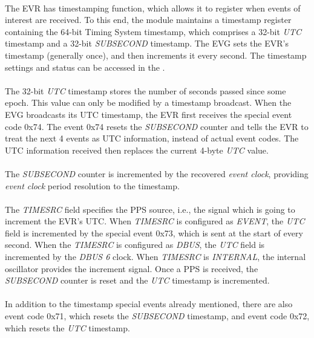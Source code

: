 \documentclass[openany]{article}
\begin{document}
			\paragraph{} The EVR has timestamping function, which allows it to register when events of interest are received. To this end, the module maintains a timestamp register containing the 64-bit Timing System timestamp, which comprises a 32-bit \emph{UTC} timestamp and a 32-bit \emph{SUBSECOND} timestamp. The EVG sets the EVR's timestamp (generally once), and then increments it every second. The timestamp settings and status can be accessed in the .
			\paragraph{} The 32-bit \emph{UTC} timestamp stores the number of seconds passed since some epoch. This value can only be modified by a timestamp broadcast. When the EVG broadcasts its UTC timestamp, the EVR first receives the special event code 0x74. The event 0x74 resets the \emph{SUBSECOND} counter and tells the EVR to treat the next 4 events as UTC information, instead of actual event codes. The UTC information received then replaces the current 4-byte \emph{UTC} value.
			\paragraph{} The \emph{SUBSECOND} counter is incremented by the recovered \emph{event clock}, providing \emph{event clock} period resolution to the timestamp.
			\paragraph{} The \emph{TIMESRC} field specifies the PPS source, i.e., the signal which is going to increment the EVR's UTC. When \emph{TIMESRC} is configured as \emph{EVENT}, the \emph{UTC} field is incremented by the special event 0x73, which is sent at the start of every second. When the \emph{TIMESRC} is configured as \emph{DBUS}, the \emph{UTC} field is incremented by the \emph{DBUS 6} clock. When \emph{TIMESRC} is \emph{INTERNAL}, the internal oscillator provides the increment signal. Once a PPS is received, the \emph{SUBSECOND} counter is reset and the \emph{UTC} timestamp is incremented.
			\paragraph{} In addition to the timestamp special events already mentioned, there are also event code 0x71, which resets the \emph{SUBSECOND} timestamp, and event code 0x72, which resets the \emph{UTC} timestamp.
\end{document}
